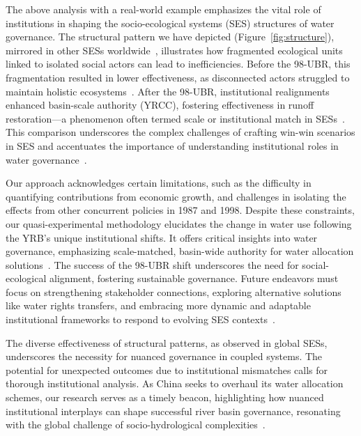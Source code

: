 The above analysis with a real-world example emphasizes the vital role of institutions in shaping the socio-ecological systems (SES) structures of water governance.
The structural pattern we have depicted (Figure~\ref{fig:structure}), mirrored in other SESs worldwide~\cite{kluger2020,guerrero2015,bodin2012}, illustrates how fragmented ecological units linked to isolated social actors can lead to inefficiencies.
Before the 98-UBR, this fragmentation resulted in lower effectiveness, as disconnected actors struggled to maintain holistic ecosystems~\cite{sayles2017,sayles2019,cai2016,bergsten2019}.
After the 98-UBR, institutional realignments enhanced basin-scale authority (YRCC), fostering effectiveness in runoff restoration—a phenomenon often termed scale or institutional match in SESs~\cite{cumming2020a,wang2019d}.
This comparison underscores the complex challenges of crafting win-win scenarios in SES and accentuates the importance of understanding institutional roles in water governance~\cite{hegwood2022,bergsten2019, sayles2019}.

Our approach acknowledges certain limitations, such as the difficulty in quantifying contributions from economic growth, and challenges in isolating the effects from other concurrent policies in 1987 and 1998.
Despite these constraints, our quasi-experimental methodology elucidates the change in water use following the YRB's unique institutional shifts.
It offers critical insights into water governance, emphasizing scale-matched, basin-wide authority for water allocation solutions~\cite{bodin2017b, ostrom2009, reyers2018}.
The success of the 98-UBR shift underscores the need for social-ecological alignment, fostering sustainable governance.
Future endeavors must focus on strengthening stakeholder connections, exploring alternative solutions like water rights transfers, and embracing more dynamic and adaptable institutional frameworks to respond to evolving SES contexts~\cite{reyers2018}.

The diverse effectiveness of structural patterns, as observed in global SESs, underscores the necessity for nuanced governance in coupled systems. The potential for unexpected outcomes due to institutional mismatches calls for thorough institutional analysis. As China seeks to overhaul its water allocation schemes, our research serves as a timely beacon, highlighting how nuanced institutional interplays can shape successful river basin governance, resonating with the global challenge of socio-hydrological complexities~\cite{muneepeerakul2017, leslie2015, hegwood2022}.

